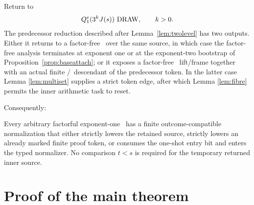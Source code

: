 Return to
\[
 Q_1^e(3^kJ(s))\text{ \ensuremath{\mathrm{DRAW}}},\qquad k>0.
\]
The predecessor reduction described after Lemma~\ref{lem:twolevel} has two
outputs. Either it returns to a factor-free \DRAW\ over the same source, in
which case the factor-free analysis terminates at exponent one or at the
exponent-two bootstrap of Proposition~\ref{prop:baseattach}; or it exposes a
factor-free \DRAW\ lift/frame together with an actual finite \WIN/\LOSS\
descendant of the predecessor token. In the latter case Lemma
\ref{lem:multiset} supplies a strict token edge, after which Lemma
\ref{lem:fibre} permits the inner arithmetic task to reset.

Consequently:
\begin{proposition}\label{prop:attachment}
Every arbitrary factorful exponent-one \DRAW\ has a finite outcome-compatible
normalization that either strictly lowers the retained source, strictly lowers
an already marked finite proof token, or consumes the one-shot entry bit and
enters the typed normalizer. No comparison $t<s$ is required for the temporary
returned inner source.
\end{proposition}

\section{Proof of the main theorem}

